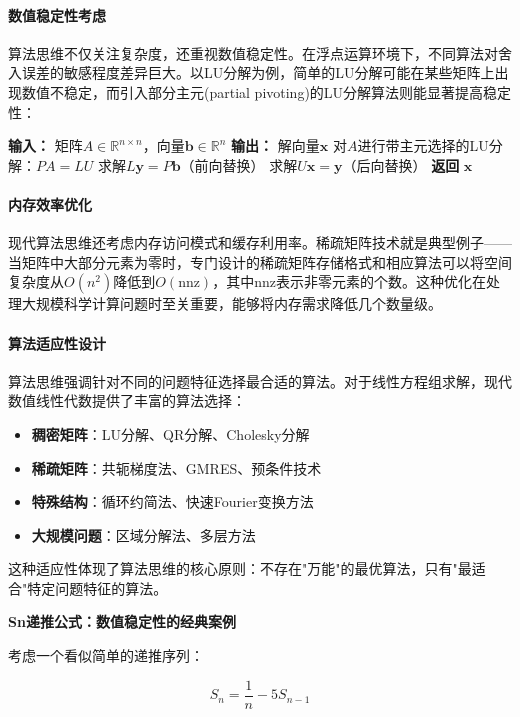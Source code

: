 \paragraph{数值稳定性考虑}
算法思维不仅关注复杂度，还重视数值稳定性。在浮点运算环境下，不同算法对舍入误差的敏感程度差异巨大。以LU分解为例，简单的LU分解可能在某些矩阵上出现数值不稳定，而引入部分主元(partial pivoting)的LU分解算法则能显著提高稳定性：

\begin{algorithmic}[1]
\STATE \textbf{输入：} 矩阵$A \in \mathbb{R}^{n \times n}$，向量$\mathbf{b} \in \mathbb{R}^n$
\STATE \textbf{输出：} 解向量$\mathbf{x}$
\STATE 对$A$进行带主元选择的LU分解：$PA = LU$
\STATE 求解$L\mathbf{y} = P\mathbf{b}$（前向替换）
\STATE 求解$U\mathbf{x} = \mathbf{y}$（后向替换）
\STATE \textbf{返回} $\mathbf{x}$
\end{algorithmic}

\paragraph{内存效率优化}
现代算法思维还考虑内存访问模式和缓存利用率。稀疏矩阵技术就是典型例子——当矩阵中大部分元素为零时，专门设计的稀疏矩阵存储格式和相应算法可以将空间复杂度从$O(n^2)$降低到$O(\text{nnz})$，其中nnz表示非零元素的个数。这种优化在处理大规模科学计算问题时至关重要，能够将内存需求降低几个数量级。

\paragraph{算法适应性设计}
算法思维强调针对不同的问题特征选择最合适的算法。对于线性方程组求解，现代数值线性代数提供了丰富的算法选择：
\begin{itemize}
\item \textbf{稠密矩阵}：LU分解、QR分解、Cholesky分解
\item \textbf{稀疏矩阵}：共轭梯度法、GMRES、预条件技术
\item \textbf{特殊结构}：循环约简法、快速Fourier变换方法
\item \textbf{大规模问题}：区域分解法、多层方法
\end{itemize}

这种适应性体现了算法思维的核心原则：不存在"万能"的最优算法，只有"最适合"特定问题特征的算法。

\textbf{Sn递推公式：数值稳定性的经典案例}

考虑一个看似简单的递推序列：

$$S_n = \frac{1}{n} - 5S_{n-1}$$

